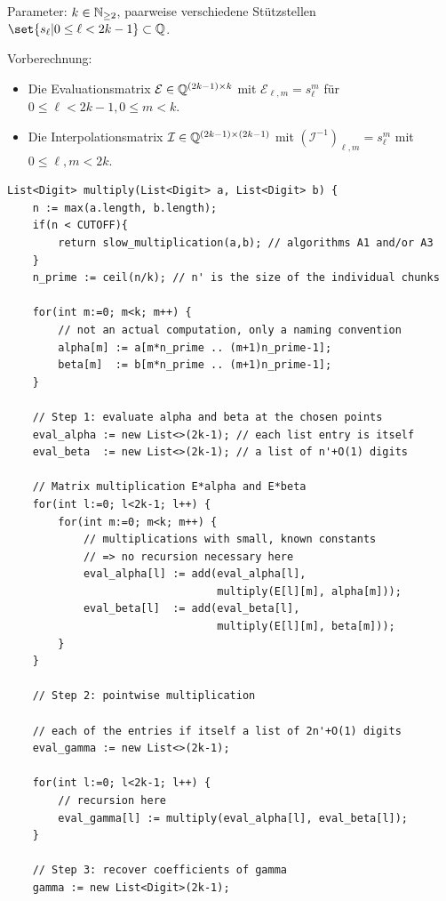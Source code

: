 \begin{algorithm}
    \label{ag:toom_cook}
    Parameter: $k\in\mathbb{N}_{\geq{2}}$, paarweise verschiedene Stützstellen $\set{s_\ell | 0\leq\ell<2k-1}\subset\IQ$.

    Vorberechnung:
    \begin{itemize}
        \item Die Evaluationsmatrix $\mathcal{E}\in\mathbb{Q}^{(2k-1)\times k}$ mit $\mathcal{E}_{\ell,m} = s_\ell^m$ für $0\leq\ell<2k-1, 0\leq m<k$.
        \item Die Interpolationsmatrix $\mathcal{I}\in\mathbb{Q}^{(2k-1)\times(2k-1)}$ mit $(\mathcal{I}^{-1})_{\ell,m} = s_\ell^m$ mit $0\leq\ell,m < 2k$.
    \end{itemize}

    \begin{lstlisting}
List<Digit> multiply(List<Digit> a, List<Digit> b) {
    n := max(a.length, b.length);
    if(n < CUTOFF){
        return slow_multiplication(a,b); // algorithms A1 and/or A3
    }
    n_prime := ceil(n/k); // n' is the size of the individual chunks

    for(int m:=0; m<k; m++) {
        // not an actual computation, only a naming convention
        alpha[m] := a[m*n_prime .. (m+1)n_prime-1];
        beta[m]  := b[m*n_prime .. (m+1)n_prime-1];
    }

    // Step 1: evaluate alpha and beta at the chosen points
    eval_alpha := new List<>(2k-1); // each list entry is itself
    eval_beta  := new List<>(2k-1); // a list of n'+O(1) digits

    // Matrix multiplication E*alpha and E*beta
    for(int l:=0; l<2k-1; l++) {
        for(int m:=0; m<k; m++) {
            // multiplications with small, known constants
            // => no recursion necessary here
            eval_alpha[l] := add(eval_alpha[l],
                                 multiply(E[l][m], alpha[m]));
            eval_beta[l]  := add(eval_beta[l],
                                 multiply(E[l][m], beta[m]));
        }
    }

    // Step 2: pointwise multiplication

    // each of the entries if itself a list of 2n'+O(1) digits
    eval_gamma := new List<>(2k-1);

    for(int l:=0; l<2k-1; l++) {
        // recursion here
        eval_gamma[l] := multiply(eval_alpha[l], eval_beta[l]);
    }

    // Step 3: recover coefficients of gamma
    gamma := new List<Digit>(2k-1);


\end{lstlisting}
\end{algorithm}
